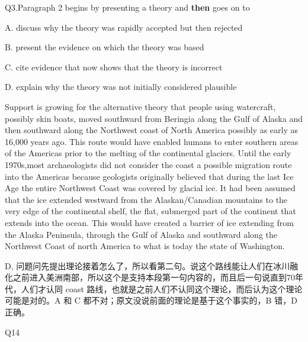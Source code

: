 \begin{blk}
    \begin{qst}
        Q3.Paragraph 2 begins by presenting a theory and \textbf{then} goes on to
    \end{qst}

    \begin{chc}
        A. discuss why the theory was rapidly accepted but then rejected

        B. present the evidence on which the theory was based

        C. cite evidence that now shows that the theory is incorrect

        D. explain why the theory was not initially considered plausible
    \end{chc}

    \begin{psgq}
        Support is growing for the alternative theory that people using watercraft, possibly skin boats, moved southward from Beringia along the Gulf of Alaska and then southward along the Northwest coast of North America possibly as early as 16,000 years ago. This route would have enabled humans to enter southern areas of the Americas prior to the melting of the continental glaciers. Until the early 1970s,most archaeologists did not consider the coast a possible migration route into the Americas because geologists originally believed that during the last Ice Age the entire Northwest Coast was covered by glacial ice. It had been assumed that the ice extended westward from the Alaskan/Canadian mountains to the very edge of the continental shelf, the flat, submerged part of the continent that extends into the ocean. This would have created a barrier of ice extending from the Alaska Peninsula, through the Gulf of Alaska and southward along the Northwest Coast of north America to what is today the state of Washington.
    \end{psgq}

    \begin{nlz}
        D, 问题问先提出理论接着怎么了，所以看第二句。说这个路线能让人们在冰川融化之前进入美洲南部，所以这个是支持本段第一句内容的，而且后一句说直到70年代，人们才认同 coast 路线，也就是之前人们不认同这个理论，而后认为这个理论可能是对的。A 和 C 都不对；原文没说前面的理论是基于这个事实的，B 错，D 正确。
    \end{nlz}
\end{blk}

\begin{blk}
    \begin{qst}
        Q14
    \end{qst}
\end{blk}

